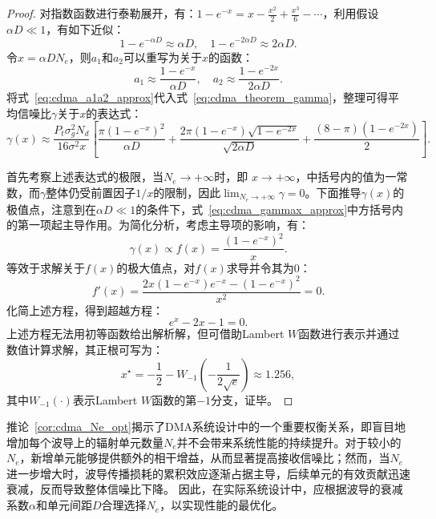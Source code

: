 \begin{proof}
	对指数函数进行泰勒展开，有：$1-e^{-x} = x-\frac{x^2}{2}+\frac{x^3}{6}-\cdots$，利用假设$\alpha D \ll 1$，有如下近似：
	\begin{equation}
		1 - e^{-\alpha D} \approx \alpha D, \quad 1 - e^{-2\alpha D} \approx 2\alpha D.
	\end{equation}
	令$x = \alpha D N_e$，则$a_1$和$a_2$可以重写为关于$x$的函数：
	\begin{equation}\label{eq:cdma_a1a2_approx}
		a_1 \approx \frac{1 - e^{-x}}{\alpha D}, \quad a_2 \approx \frac{1 - e^{-2x}}{2\alpha D}.
	\end{equation}
	将式~\eqref{eq:cdma_a1a2_approx}代入式~\eqref{eq:cdma_theorem_gamma}，整理可得平均信噪比$\gamma$关于$x$的表达式：
	\begin{equation}\label{eq:cdma_gammax_approx}
		\gamma(x) \approx \frac{P_{t}\sigma_g^2 N_d}{16\sigma^2 x}
		\left[ \frac{\pi(1-e^{-x})^2}{\alpha D} + \frac{2\pi(1-e^{-x})\sqrt{1-e^{-2x}}}{\sqrt{2\alpha D}} + \frac{(8-\pi)(1-e^{-2x})}{2} \right].
	\end{equation}
	
	首先考察上述表达式的极限，当$N_e\to+\infty$时，即 $x \to +\infty$，中括号内的值为一常数，而$\gamma$整体仍受前置因子$1/x$的限制，因此$\lim_{N_e\to +\infty}\gamma = 0$。下面推导$\gamma(x)$的极值点，注意到在$\alpha D \ll 1$的条件下，式~\eqref{eq:cdma_gammax_approx}中方括号内的第一项起主导作用。为简化分析，考虑主导项的影响，有：
	\begin{equation}
		\gamma(x) \propto f(x) = \frac{(1-e^{-x})^2}{x}.
	\end{equation}
	等效于求解关于$f(x)$的极大值点，对$f(x)$求导并令其为0：
	\begin{equation}
		f'(x) = \frac{2x(1-e^{-x})e^{-x} - (1-e^{-x})^2}{x^2} = 0.
	\end{equation}
	化简上述方程，得到超越方程：
	\begin{equation}
		e^x - 2x - 1 = 0.
	\end{equation}
	上述方程无法用初等函数给出解析解，但可借助Lambert $W$函数进行表示并通过数值计算求解，其正根可写为：
	\begin{equation}
		x^\star = -\frac{1}{2} - W_{-1}\left( -\frac{1}{2\sqrt{e}} \right) \approx 1.256,
	\end{equation}
	其中$W_{-1}(\cdot)$表示Lambert $W$函数的第$-1$分支，证毕。
\end{proof}

推论~\ref{cor:cdma_Ne_opt}揭示了DMA系统设计中的一个重要权衡关系，即盲目地增加每个波导上的辐射单元数量$N_e$并不会带来系统性能的持续提升。对于较小的$N_e$，新增单元能够提供额外的相干增益，从而显著提高接收信噪比；然而，当$N_e$进一步增大时，波导传播损耗的累积效应逐渐占据主导，后续单元的有效贡献迅速衰减，反而导致整体信噪比下降。
因此，在实际系统设计中，应根据波导的衰减系数$\alpha$和单元间距$D$合理选择$N_e$，以实现性能的最优化。



